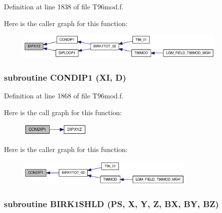 Definition at line 1838 of file T96mod.f.

Here is the caller graph for this function:\nopagebreak
\begin{figure}[H]
\begin{center}
\leavevmode
\includegraphics[width=291pt]{_t96mod_8f_76f3ffff48346c7a53f738f013945222_icgraph}
\end{center}
\end{figure}
\hypertarget{_t96mod_8f_2432dab29def6a7f82b4e61542784ca2}{
\subsubsection[{CONDIP1}]{\setlength{\rightskip}{0pt plus 5cm}subroutine CONDIP1 (XI, \/  D)}}
\label{_t96mod_8f_2432dab29def6a7f82b4e61542784ca2}




Definition at line 1868 of file T96mod.f.

Here is the call graph for this function:\nopagebreak
\begin{figure}[H]
\begin{center}
\leavevmode
\includegraphics[width=96pt]{_t96mod_8f_2432dab29def6a7f82b4e61542784ca2_cgraph}
\end{center}
\end{figure}


Here is the caller graph for this function:\nopagebreak
\begin{figure}[H]
\begin{center}
\leavevmode
\includegraphics[width=245pt]{_t96mod_8f_2432dab29def6a7f82b4e61542784ca2_icgraph}
\end{center}
\end{figure}
\hypertarget{_t96mod_8f_e7df392ea162336df5811079016b08ac}{
\subsubsection[{BIRK1SHLD}]{\setlength{\rightskip}{0pt plus 5cm}subroutine BIRK1SHLD (PS, \/  X, \/  Y, \/  Z, \/  BX, \/  BY, \/  BZ)}}
\label{_t96mod_8f_e7df392ea162336df5811079016b08ac}




